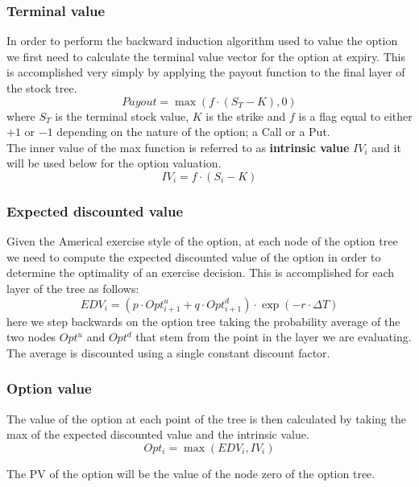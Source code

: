 \documentclass{article}
\begin{document}
\subsubsection{Terminal value}
In order to perform the backward induction algorithm used to value the option we first need to calculate the terminal value vector for the option at expiry. This is accomplished very simply by applying the payout function to the final layer of the stock tree. 
\[
Payout = \max \left( f \cdot (S_T - K), 0 \right)
\]
where $S_T$ is the terminal stock value, $K$ is the strike and $f$ is a flag equal to either $+1$ or $-1$ depending on the nature of the option; a Call or a Put.\\
The inner value of the max function is referred to as \textbf{intrinsic value} $IV_i$ and it will be used below for the option valuation.
\[
IV_i = f\cdot(S_i - K)
\]

\subsubsection{Expected discounted value}
Given the Americal exercise style of the option, at each node of the option tree we need to compute the expected discounted value of the option in order to determine the optimality of an exercise decision. This is accomplished for each layer of the tree as follows:
\begin{equation}
    EDV_i = (p\cdot Opt^u_{i+1} + q\cdot Opt^d_{i+1}) \cdot \exp(-r\cdot\Delta T)
\end{equation}
here we step backwards on the option tree taking the probability average of the two nodes $Opt^u$ and $Opt^d$ that stem from the point in the layer we are evaluating. The average is discounted using a single constant discount factor.

\subsubsection{Option value}
The value of the option at each point of the tree is then calculated by taking the max of the expected discounted value and the intrinsic value.
\begin{equation}
    Opt_i = \max(EDV_i, IV_i)
\end{equation}

The PV of the option will be the value of the node zero of the option tree.

\vspace{3cm}
\end{document}
